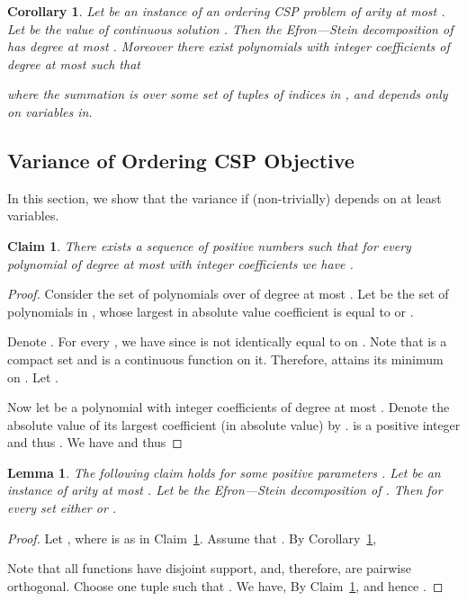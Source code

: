 \documentclass[11pt]{article}
\newif\ifconf
\newtheorem{lemma}[theorem]{Lemma}
\newtheorem{claim}[theorem]{Claim}
\newtheorem{corollary}[theorem]{Corollary}
\begin{document}
\begin{corollary}\label{cor:ES-objective}
Let  be an instance of an ordering CSP problem of arity
at most . Let  be the value of continuous solution .
Then the Efron---Stein decomposition of  has degree at most . Moreover there exist
polynomials  with integer coefficients of degree at most  such that

where the summation is over some set  of tuples of indices in , and  depends only on \ifconf\else variables in\fi .
\end{corollary}
\subsection{Variance of Ordering CSP Objective}\label{sec:variance-CSP}
In this section, we show that the variance  if   (non-trivially) depends on at least  variables.

\begin{claim}\label{claim:compact}
There exists a sequence of positive numbers  such that for every polynomial  of degree at most  with integer coefficients we have .
\end{claim}
\begin{proof}
Consider the set  of polynomials over 
of degree at most . Let  be the set of polynomials in , whose largest
in absolute value coefficient is equal to  or .

Denote . For every , we have  since  is not identically equal to  on .
Note that  is a compact set and  is a continuous function on it.
Therefore,  attains its minimum on .
Let .

Now let  be a polynomial with integer coefficients of degree at most . Denote the absolute value of its largest
coefficient (in absolute value) by .  is a positive integer and thus . We have  and thus
\ifconf
.
\else

\fi
\end{proof}
\begin{lemma}\label{lem:beta}
The following claim holds for some positive parameters . Let  be an instance of arity at most . Let  be the Efron---Stein decomposition of . Then for every set  either  or .
\end{lemma}
\begin{proof}
Let , where  is as in Claim~\ref{claim:compact}.
Assume that . By Corollary~\ref{cor:ES-objective},

Note that all functions
 have disjoint support, and, therefore, are pairwise orthogonal.
Choose one tuple  such that .
We have, 
By Claim~\ref{claim:compact},  and hence
.
\end{proof}
\end{document}
